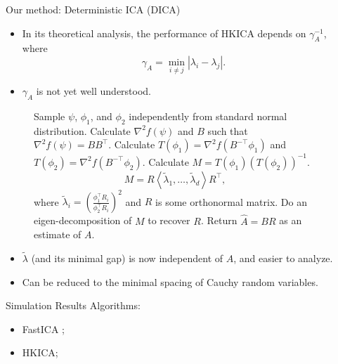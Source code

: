 \documentclass[final]{beamer} %
\begin{document}
\begin{frame}[c]
\begin{columns}[t,totalwidth=\textwidth]
	\begin{column}{0.01\textwidth}
	\end{column}
	\begin{column}{0.32\textwidth}
			
			\vspace{0.5ex}
		\begin{block}{Our method: Deterministic ICA (DICA)}	
			\begin{itemize}
				\item In its theoretical analysis,  the performance of HKICA depends on $\gamma_A^{-1}$, where
					\[
					\gamma_A = \min_{i\neq j} \left\vert \lambda_i - \lambda_j\right \vert.
					\]
					\vspace{-1cm}
				\item $\gamma_A$ is not yet well understood.
			\end{itemize}	
			\begin{figure}
			\begin{algorithmic}[1]
				\STATE Sample $\psi$, $\phi_1$, and $\phi_2$ independently from standard normal distribution.
				\STATE Calculate $\nabla^2 f(\psi)$ and $B$ such that $\nabla^2 f(\psi) = BB^{\top}$.
				\STATE Calculate $T(\phi_1) = \nabla^2 f(B^{-\top}\phi_1)$ and $T(\phi_2) = \nabla^2 f(B^{-\top}\phi_2)$.
				\STATE Calculate $M = T(\phi_1)(T(\phi_2))^{-1}$.
					\[
					M = R \left\langle\tilde{\lambda}_1, \ldots, \tilde{\lambda}_d \right\rangle R^{\top},
					\]
					where $\tilde{\lambda}_i = \left(\frac{\phi_1^{\top}R_i}{\phi_2^{\top}R_i}\right)^2$ and $R$ is some orthonormal matrix.
				\STATE Do an eigen-decomposition of $M$ to recover $R$.
				\STATE Return $\hat{A} = BR$ as an estimate of $A$. 
			\end{algorithmic}
			\end{figure}
			\begin{itemize}
				\item $\tilde{\lambda}$ (and its minimal gap) is now independent of $A$, and easier to analyze.
				\item Can be reduced to the minimal spacing of Cauchy random variables.
			\end{itemize}
		\end{block}
		\vspace{0.5ex}
		\begin{block}{Simulation Results}
			Algorithms:
			\begin{itemize}
				\item FastICA  \citep{szabo12separation};
				\item HKICA; 

\end{itemize}
\end{block}
\end{column}
\end{columns}
\end{frame}
\end{document}
